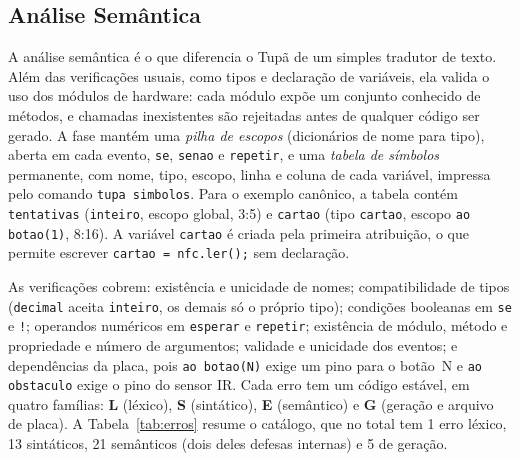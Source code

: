 \documentclass[conference]{IEEEtran}
\begin{document}
\subsection{Análise Semântica}
A análise semântica é o que diferencia o Tupã de um simples tradutor de
texto. Além das verificações usuais, como tipos e declaração de variáveis,
ela valida o uso dos módulos de hardware: cada módulo expõe um conjunto
conhecido de métodos, e chamadas inexistentes são rejeitadas antes de
qualquer código ser gerado. A fase mantém uma \emph{pilha de escopos}
(dicionários de nome para tipo), aberta em cada evento, \texttt{se},
\texttt{senao} e \texttt{repetir}, e uma \emph{tabela de símbolos}
permanente, com nome, tipo, escopo, linha e coluna de cada variável, impressa
pelo comando \texttt{tupa simbolos}. Para o exemplo canônico, a tabela contém
\texttt{tentativas} (\texttt{inteiro}, escopo global, 3:5) e \texttt{cartao}
(tipo \texttt{cartao}, escopo \texttt{ao botao(1)}, 8:16). A variável
\texttt{cartao} é criada pela primeira atribuição, o que permite escrever
\texttt{cartao = nfc.ler();} sem declaração.

As verificações cobrem: existência e unicidade de nomes; compatibilidade de
tipos (\texttt{decimal} aceita \texttt{inteiro}, os demais só o próprio
tipo); condições booleanas em \texttt{se} e \texttt{!}; operandos numéricos em
\texttt{esperar} e \texttt{repetir}; existência de módulo, método e propriedade
e número de argumentos; validade e unicidade dos eventos; e dependências da
placa, pois \texttt{ao botao(N)} exige um pino para o botão~N e
\texttt{ao obstaculo} exige o pino do sensor IR. Cada erro tem um código
estável, em quatro famílias: \textbf{L} (léxico), \textbf{S} (sintático),
\textbf{E} (semântico) e \textbf{G} (geração e arquivo de placa). A
Tabela~\ref{tab:erros} resume o catálogo, que no total tem 1 erro léxico, 13
sintáticos, 21 semânticos (dois deles defesas internas) e 5 de geração.
\end{document}

